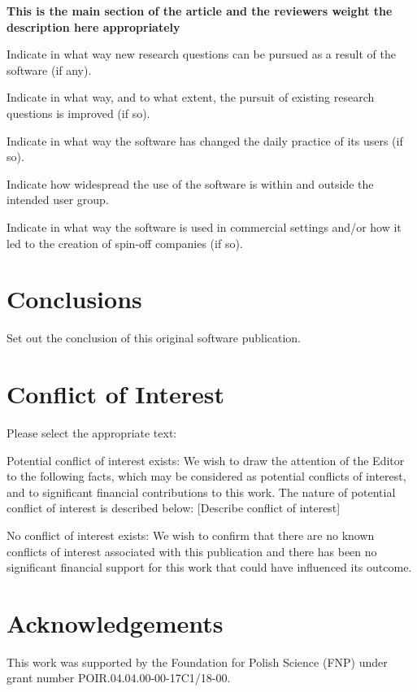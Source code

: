 \documentclass[preprint,12pt, a4paper]{elsarticle}
\newcommand{\1}{{\rm 1\hspace{-0.9mm}l}}
\begin{document}
\textbf{This is the main section of the article and the reviewers weight the description here appropriately}

Indicate in what way new research questions can be pursued as a result of the software (if any).

Indicate in what way, and to what extent, the pursuit of existing research questions is improved (if so).

Indicate in what way the software has changed the daily practice of its users (if so).

Indicate how widespread the use of the software is within and outside the intended user group.

Indicate in what way the software is used in commercial settings and/or how it led to the creation of spin-off companies (if so).

\section{Conclusions}
\label{}

Set out the conclusion of this original software publication.

\section{Conflict of Interest}
Please select the appropriate text:

Potential conflict of interest exists:
We wish to draw the attention of the Editor to the following facts, which may be considered as potential conflicts of interest, and to significant financial contributions to this work. The nature of potential conflict of interest is described below: [Describe conflict of interest]

No conflict of interest exists:
We wish to confirm that there are no known conflicts of interest associated with this publication and there has been no significant financial support for this work that could have influenced its outcome.


\section*{Acknowledgements}

This work was supported by the Foundation for Polish Science (FNP) under grant
number POIR.04.04.00-00-17C1/18-00.


\end{document}
